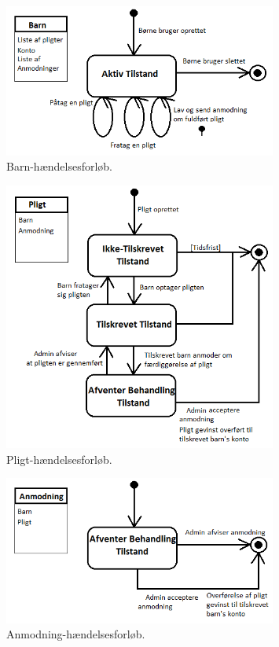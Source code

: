 \begin{figure}[H]
\centering
\includegraphics[width=0.8\textwidth]{Billeder/BoernForloeb.png}
\caption{Barn-hændelsesforløb.}
\label{BarnHaendelsesforloeb}
\end{figure}

\begin{figure}[H]
\centering
\includegraphics[width=0.8\textwidth]{Billeder/PligtForloeb.png}
\caption{Pligt-hændelsesforløb.}
\label{PligtHaendelsesforloeb}
\end{figure}

\begin{figure}[H]
\centering
\includegraphics[width=0.8\textwidth]{Billeder/AnmodningForloeb.png}
\caption{Anmodning-hændelsesforløb.}
\label{AnmodningHaendelsesforloeb}
\end{figure}
